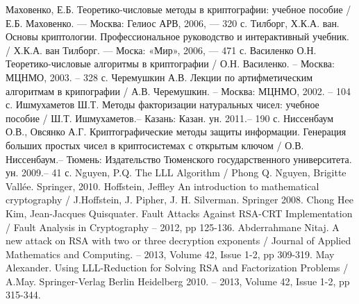 
\newpage
{}
\begin{thebibliography}{}	
	  Маховенко, Е.Б. Теоретико-числовые методы в криптографии: учебное пособие / Е.Б. Маховенко. — Москва: Гелиос АРВ, 2006, — 320 с.
	  Тилборг, Х.К.А. ван. Основы криптологии. Профессиональное руководство и интерактивный учебник. / Х.К.А. ван Тилборг. — Моска: «Мир», 2006,
	  — 471 с.
	  Василенко О.Н. Теоретико-числовые алгоритмы в криптографии / О.Н. Василенко. – Москва: МЦНМО, 2003. – 328 с.
	  Черемушкин А.В. Лекции по артифметическим алгоритмам в крипографии / А.В. Черемушкин. – Москва: МЦНМО, 2002. – 104 с.
	  Ишмухаметов Ш.Т. Методы факторизации натуральных чисел: учебное пособие / Ш.Т. Ишмухаметов.– Казань: Казан. ун. 2011.– 190 с.
	  Ниссенбаум О.В., Овсянко А.Г. Криптографические методы защиты информации. Генерация больших простых чисел в криптосистемах с открытым ключом / О.В. Ниссенбаум.– Тюмень: Издательство Тюменского государственного университета. ун. 2009.– 41 с.
	  Nguyen, P.Q. The LLL Algorithm / Phong Q. Nguyen, Brigitte Vallée. Springer, 2010.
	  Hoffstein, Jeffley An introduction to mathematical cryptography / J.Hoffstein, J. Pipher, J. H. Silverman. Springer 2008.
	  Chong Hee Kim, Jean-Jacques Quisquater. Fault Attacks Against RSA-CRT Implementation / Fault Analysis in Cryptography – 2012, pp 125-136.
	  Abderrahmane Nitaj. A new attack on RSA with two or three decryption exponents / Journal of Applied Mathematics and Computing. –
	  2013, Volume 42, Issue 1-2, pp 309-319.	
	  May Alexander. Using LLL-Reduction for Solving RSA and Factorization Problems / A.May. Springer-Verlag Berlin Heidelberg 2010. –
	  2013, Volume 42, Issue 1-2, pp 315-344.	
\end{thebibliography}